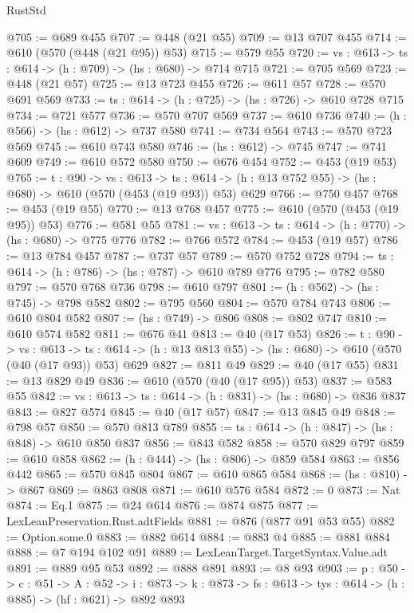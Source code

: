 \begin{lexlean}{RustStd}
\begin{coremodule}
@705 := @689 @455
@707 := @448 (@21 @55)
@709 := @13 @707 @455
@714 := @610 (@570 (@448 (@21 @95)) @53)
@715 := @579 @55
@720 := {vs : @613} -> {ts : @614} -> (h : @709) -> (hs : @680) -> @714 @715
@721 := @705 @569
@723 := @448 (@21 @57)
@725 := @13 @723 @455
@726 := @611 @57
@728 := @570 @691 @569
@733 := {ts : @614} -> (h : @725) -> (hs : @726) -> @610 @728 @715
@734 := @721 @577
@736 := @570 @707 @569
@737 := @610 @736
@740 := (h : @566) -> (hs : @612) -> @737 @580
@741 := @734 @564
@743 := @570 @723 @569
@745 := @610 @743 @580
@746 := (hs : @612) -> @745
@747 := @741 @609
@749 := @610 @572 @580
@750 := @676 @454
@752 := @453 (@19 @53)
@765 := {t : @90} ->
  {vs : @613} ->
  {ts : @614} -> (h : @13 @752 @55) -> (hs : @680) -> @610 (@570 (@453 (@19 @93)) @53) @629
@766 := @750 @457
@768 := @453 (@19 @55)
@770 := @13 @768 @457
@775 := @610 (@570 (@453 (@19 @95)) @53)
@776 := @581 @55
@781 := {vs : @613} -> {ts : @614} -> (h : @770) -> (hs : @680) -> @775 @776
@782 := @766 @572
@784 := @453 (@19 @57)
@786 := @13 @784 @457
@787 := @737 @57
@789 := @570 @752 @728
@794 := {ts : @614} -> (h : @786) -> (hs : @787) -> @610 @789 @776
@795 := @782 @580
@797 := @570 @768 @736
@798 := @610 @797
@801 := (h : @562) -> (hs : @745) -> @798 @582
@802 := @795 @560
@804 := @570 @784 @743
@806 := @610 @804 @582
@807 := (hs : @749) -> @806
@808 := @802 @747
@810 := @610 @574 @582
@811 := @676 @41
@813 := @40 (@17 @53)
@826 := {t : @90} ->
  {vs : @613} ->
  {ts : @614} -> (h : @13 @813 @55) -> (hs : @680) -> @610 (@570 (@40 (@17 @93)) @53) @629
@827 := @811 @49
@829 := @40 (@17 @55)
@831 := @13 @829 @49
@836 := @610 (@570 (@40 (@17 @95)) @53)
@837 := @583 @55
@842 := {vs : @613} -> {ts : @614} -> (h : @831) -> (hs : @680) -> @836 @837
@843 := @827 @574
@845 := @40 (@17 @57)
@847 := @13 @845 @49
@848 := @798 @57
@850 := @570 @813 @789
@855 := {ts : @614} -> (h : @847) -> (hs : @848) -> @610 @850 @837
@856 := @843 @582
@858 := @570 @829 @797
@859 := @610 @858
@862 := (h : @444) -> (hs : @806) -> @859 @584
@863 := @856 @442
@865 := @570 @845 @804
@867 := @610 @865 @584
@868 := (hs : @810) -> @867
@869 := @863 @808
@871 := @610 @576 @584
@872 := 0
@873 := Nat
@874 := Eq.{1}
@875 := @24 @614
@876 := @874 @875
@877 := LexLeanPreservation.Rust.adtFields
@881 := @876 (@877 @91 @53 @55)
@882 := Option.some.{0}
@883 := @882 @614
@884 := @883 @4
@885 := @881 @884
@888 := @7 @194 @102 @91
@889 := LexLeanTarget.TargetSyntax.Value.adt
@891 := @889 @95 @53
@892 := @888 @891
@893 := @8 @93
@903 := {p : @50} ->
  {c : @51} ->
  {A : @52} ->
  {i : @873} -> {k : @873} -> {fs : @613} -> {tys : @614} -> (h : @885) -> (hf : @621) -> @892 @893

\end{coremodule}
\end{lexlean}
